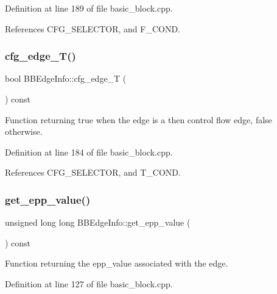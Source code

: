 Definition at line 189 of file basic\+\_\+block.\+cpp.



References C\+F\+G\+\_\+\+S\+E\+L\+E\+C\+T\+OR, and F\+\_\+\+C\+O\+ND.

\mbox{\label{structBBEdgeInfo_ad703ec6c8aedbf0b9b09f9e9f61da4ce}} 
\subsubsection{\texorpdfstring{cfg\+\_\+edge\+\_\+\+T()}{cfg\_edge\_T()}}
{\footnotesize\ttfamily bool B\+B\+Edge\+Info\+::cfg\+\_\+edge\+\_\+T (\begin{DoxyParamCaption}{ }\end{DoxyParamCaption}) const}



Function returning true when the edge is a then control flow edge, false otherwise. 



Definition at line 184 of file basic\+\_\+block.\+cpp.



References C\+F\+G\+\_\+\+S\+E\+L\+E\+C\+T\+OR, and T\+\_\+\+C\+O\+ND.

\mbox{\label{structBBEdgeInfo_a4d4fe21eb77760b1fda1fbf32a55d553}} 
\subsubsection{\texorpdfstring{get\+\_\+epp\+\_\+value()}{get\_epp\_value()}}
{\footnotesize\ttfamily unsigned long long B\+B\+Edge\+Info\+::get\+\_\+epp\+\_\+value (\begin{DoxyParamCaption}{ }\end{DoxyParamCaption}) const}



Function returning the epp\+\_\+value associated with the edge. 



Definition at line 127 of file basic\+\_\+block.\+cpp.



